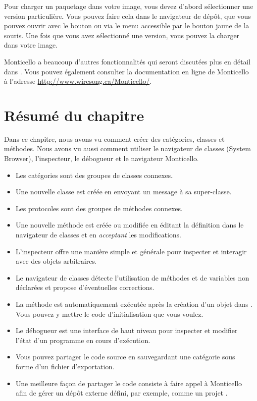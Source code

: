 \documentclass[a4paper,10pt,twoside]{book}
\begin{document}

Pour charger un paquetage dans votre image, vous devez d'abord
sélectionner une version particulière. Vous pouvez faire cela dans le
navigateur de dépôt, que vous pouvez ouvrir avec le bouton
 ou via le menu accessible par le bouton jaune de la
souris. Une fois que vous avez sélectionné une version, vous pouvez la
charger dans votre image.


Monticello a beaucoup d'autres fonctionnalités qui seront discutées
plus en détail dans .
Vous pouvez également consulter la documentation en ligne de
Monticello à l'adresse \url{http://www.wiresong.ca/Monticello/}.

\section{Résumé du chapitre}
Dans ce chapitre, nous avons vu comment créer des catégories, classes
et méthodes. Nous avons vu aussi comment utiliser le navigateur de
classes (System Browser), l'inspecteur, le débogueur et le
navigateur Monticello.

\begin{itemize}
  \item Les catégories sont des groupes de classes connexes.
  \item Une nouvelle classe est créée en envoyant un message à sa super-classe.
  \item Les protocoles sont des groupes de méthodes connexes.
  \item Une nouvelle méthode est créée ou modifiée en éditant la définition dans le navigateur de classes et en \emph{acceptant} les modifications.
  \item L'inspecteur offre une manière simple et générale pour inspecter et interagir avec des objets arbitraires.
  \item Le navigateur de classes détecte l'utilisation de méthodes et de variables non déclarées et propose d'éventuelles corrections.
  \item La méthode  est automatiquement ex\'ecutée après
    la création d'un objet dans \sq. Vous pouvez y mettre
    le code d'initialisation que vous voulez.
  \item Le débogueur est une interface de haut niveau pour inspecter et modifier l'état d'un programme en cours d'ex\'ecution.
  \item Vous pouvez partager le code source en sauvegardant une
    catégorie sous forme d'un fichier d'exportation.
  \item Une meilleure façon de partager le code consiste \`a faire
    appel \`a Monticello afin de gérer un dépôt externe défini, par
    exemple, comme un projet \squeaksource.
\end{itemize}

\ifx\wholebook\relax\else
\end{document}
